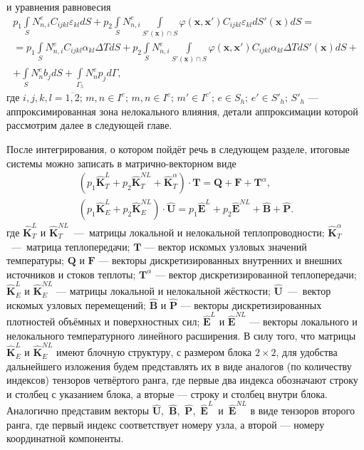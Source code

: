 и уравнения равновесия
\begin{multline}
	\label{eq:StressIntegrateIndices}
	p_1 \int\limits_S N_{n,i}^{e} C_{ijkl} \varepsilon_{kl} dS
	+
	p_2 \int\limits_S N_{n, i}^{e} \int\limits_{S'(\boldsymbol{x}) \cap S}
	\varphi(\boldsymbol{x}, \boldsymbol{x}') C_{ijkl} \varepsilon_{kl} dS'(\boldsymbol{x}) dS
	= \\ =
	p_1 \int\limits_S N_{n,i}^{e} C_{ijkl} \alpha_{kl} \Delta T dS +
	p_2 \int\limits_S N_{n,i}^{e}
	\int\limits_{S'(\boldsymbol{x}) \cap S} 
	\varphi(\boldsymbol{x}, \boldsymbol{x}')
	C_{ijkl} \alpha_{kl} \Delta T dS'(\boldsymbol{x}) dS 
	+ \\ +
	\int\limits_S N_n^{e} b_j dS +
	\int\limits_{\Gamma_5} N_n^{e} p_j d\Gamma,
\end{multline}
где $i,j,k,l = \overline{1, 2}$; $m, n \in I^e$; $m, n \in I^e$; $m' \in I^{e'}$; $e \in S_h$; $e' \in S'_h$; $S'_h$ --- аппроксимированная зона нелокального влияния, детали аппроксимации которой рассмотрим далее в следующей главе.

После интегрирования, о котором пойдёт речь в следующем разделе, итоговые системы можно записать в матрично-векторном виде
\begin{gather}
	\label{eq:ThermalSLAE}
	\left( p_1 \widehat{\textbf{K}}^L_T + p_2 \widehat{\textbf{K}}^{NL}_T + \widehat{\textbf{K}}^{\alpha}_T \right) \cdot \textbf{T} = \textbf{Q} + \textbf{F} + \textbf{T}^{\alpha}, \\
	\label{eq:StressSLAE}
	\left( p_1 \widehat{\textbf{K}}^L_E + p_2 \widehat{\textbf{K}}^{NL}_E \right) \cdot \widehat{\textbf{U}} = p_1 \widehat{\textbf{E}}^L + p_2 \widehat{\textbf{E}}^{NL} + \widehat{\textbf{B}} + \widehat{\textbf{P}}.
\end{gather}
где $\widehat{\textbf{K}}^L_T$ и $\widehat{\textbf{K}}^{NL}_T$~---~матрицы локальной и нелокальной теплопроводности;
$\widehat{\textbf{K}}^{\alpha}_T$~---~матрица теплопередачи;
$\textbf{T}$ --- вектор искомых узловых значений температуры;
$\textbf{Q}$ и $\textbf{F}$ --- векторы дискретизированных внутренних и внешних источников и стоков теплоты;
$\textbf{T}^{\alpha}$ --- вектор дискретизированной теплопередачи;
$\widehat{\textbf{K}}^L_E$ и $\widehat{\textbf{K}}^{NL}_E$ --- матрицы локальной и нелокальной жёсткости;
$\widehat{\textbf{U}}$~---~вектор искомых узловых перемещений;
$\widehat{\textbf{B}}$ и $\widehat{\textbf{P}}$ --- векторы дискретизированных плотностей объёмных и поверхностных сил;
$\widehat{\textbf{E}}^L$ и $\widehat{\textbf{E}}^{NL}$ --- векторы локального и нелокального температурного линейного расширения.
В силу того, что матрицы $\widehat{\textbf{K}}^L_E$ и $\widehat{\textbf{K}}^{NL}_E$ имеют блочную структуру, с размером блока $2 \times 2$, для удобства дальнейшего изложения будем представлять их в виде аналогов (по количеству индексов) тензоров четвёртого ранга, где первые два индекса обозначают строку и столбец с указанием блока, а вторые --- строку и столбец внутри блока.
Аналогично представим векторы \mbox{$\widehat{\textbf{U}}$, $\widehat{\textbf{B}}$, $\widehat{\textbf{P}}$, $\widehat{\textbf{E}}^L$ и $\widehat{\textbf{E}}^{NL}$} в виде тензоров второго ранга, где первый индекс соответствует номеру узла, а второй --- номеру координатной компоненты.

